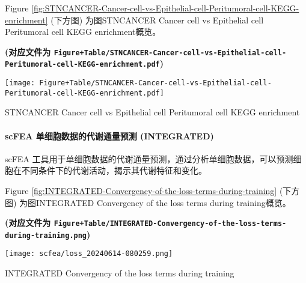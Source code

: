 \documentclass[
]{article}
\begin{document}
\begin{center}\vspace{1.5cm}\end{center}

Figure \ref{fig:STNCANCER-Cancer-cell-vs-Epithelial-cell-Peritumoral-cell-KEGG-enrichment} (下方图) 为图STNCANCER Cancer cell vs Epithelial cell Peritumoral cell KEGG enrichment概览。

\textbf{(对应文件为 \texttt{Figure+Table/STNCANCER-Cancer-cell-vs-Epithelial-cell-Peritumoral-cell-KEGG-enrichment.pdf})}

\def\@captype{figure}
\begin{center}
\texttt{[image: Figure+Table/STNCANCER-Cancer-cell-vs-Epithelial-cell-Peritumoral-cell-KEGG-enrichment.pdf]}
\caption{STNCANCER Cancer cell vs Epithelial cell Peritumoral cell KEGG enrichment}\label{fig:STNCANCER-Cancer-cell-vs-Epithelial-cell-Peritumoral-cell-KEGG-enrichment}
\end{center}

\begin{center}\vspace{1.5cm}\end{center}

\hypertarget{scfea-ux5355ux7ec6ux80deux6570ux636eux7684ux4ee3ux8c22ux901aux91cfux9884ux6d4b-integrated}{%
\paragraph{scFEA 单细胞数据的代谢通量预测 (INTEGRATED)}\label{scfea-ux5355ux7ec6ux80deux6570ux636eux7684ux4ee3ux8c22ux901aux91cfux9884ux6d4b-integrated}}

scFEA 工具用于单细胞数据的代谢通量预测，通过分析单细胞数据，可以预测细胞在不同条件下的代谢活动，揭示其代谢特征和变化。

\begin{center}\vspace{1.5cm}\end{center}

Figure \ref{fig:INTEGRATED-Convergency-of-the-loss-terms-during-training} (下方图) 为图INTEGRATED Convergency of the loss terms during training概览。

\textbf{(对应文件为 \texttt{Figure+Table/INTEGRATED-Convergency-of-the-loss-terms-during-training.png})}

\def\@captype{figure}
\begin{center}
\texttt{[image: scfea/loss\_20240614-080259.png]}
\caption{INTEGRATED Convergency of the loss terms during training}\label{fig:INTEGRATED-Convergency-of-the-loss-terms-during-training}
\end{center}
\end{document}
